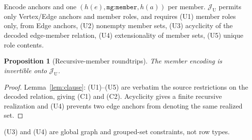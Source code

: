 \documentclass[11pt]{article}
\theoremstyle{plain}
\newtheorem{proposition}[theorem]{Proposition}
\theoremstyle{definition}
\theoremstyle{remark}
\newcommand{\mg}[1]{\texttt{mg:#1}}
\newcommand{\Img}[1]{\mathcal J_{\mathrm{#1}}}
\begin{document}
Encode anchors and one $(h(e),\mg{member},h(a))$ per member. $\Img{U}$ permits only
Vertex/Edge anchors and member roles, and requires
\textup{(U1)} member roles only, from Edge anchors,
\textup{(U2)} nonempty member sets,
\textup{(U3)} acyclicity of the decoded edge-member relation,
\textup{(U4)} extensionality of member sets,
\textup{(U5)} unique role contents.
\begin{proposition}[Recursive-member roundtrips]\label{prop:uber}
The member encoding is invertible onto $\Img{U}$.
\end{proposition}
\begin{proof}
Lemma~\ref{lem:clause}: (U1)--(U5) are verbatim the source restrictions on the decoded
relation, giving (C1) and (C2). Acyclicity gives a finite recursive realization and
(U4) prevents two edge anchors from denoting the same realized set.
\end{proof}
(U3) and (U4) are global graph and grouped-set constraints, not row types.
\end{document}
